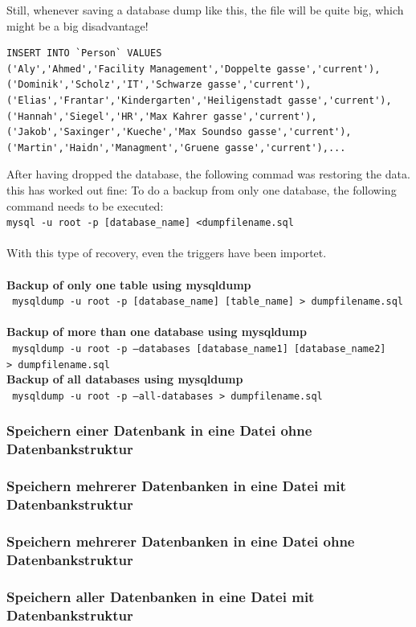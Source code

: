 \documentclass[10pt]{article}
\begin{document}
Still, whenever saving a database dump like this, the file will be quite big, which might be a big disadvantage! 
\begin{lstlisting}    
INSERT INTO `Person` VALUES 
('Aly','Ahmed','Facility Management','Doppelte gasse','current'),
('Dominik','Scholz','IT','Schwarze gasse','current'),
('Elias','Frantar','Kindergarten','Heiligenstadt gasse','current'),
('Hannah','Siegel','HR','Max Kahrer gasse','current'),
('Jakob','Saxinger','Kueche','Max Soundso gasse','current'),
('Martin','Haidn','Managment','Gruene gasse','current'),...
\end{lstlisting}    
After having dropped the database, the following commad was restoring the data. this has worked out fine:
To do a backup from only one database, the following command needs to be executed: \\
\texttt{mysql -u root -p [database\_name] \textless dumpfilename.sql} \\ \\
With this type of recovery, even the triggers have been importet.
\\ \\
\textbf{Backup of only one table using mysqldump}\\
\texttt{ mysqldump -u root -p [database\_name] [table\_name] \textgreater ~dumpfilename.sql } \\ \\
\textbf{Backup of more than one database using mysqldump}\\
\texttt{ mysqldump -u root -p --databases [database\_name1] [database\_name2] \textgreater ~dumpfilename.sql } \\ 
\textbf{Backup of all databases using mysqldump}\\
\texttt{ mysqldump -u root -p --all-databases \textgreater ~dumpfilename.sql }
\subsubsection{Speichern einer Datenbank in eine Datei ohne Datenbankstruktur}
\subsubsection{Speichern mehrerer Datenbanken in eine Datei mit Datenbankstruktur}
\subsubsection{Speichern mehrerer Datenbanken in eine Datei ohne Datenbankstruktur}
\subsubsection{Speichern aller Datenbanken in eine Datei mit Datenbankstruktur}
\end{document}
